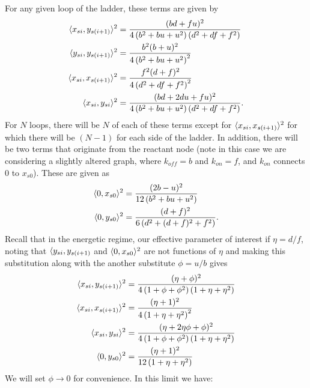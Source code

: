For any given loop of the ladder, these terms are given by
\[
\begin{aligned}
 \langle x_{si}, y_{s(i+1)} \rangle^2 &=\frac{(b d+f u)^2}{4 \left(b^2+b u+u^2\right) \left(d^2+d f+f^2\right)}\\
 \langle y_{si}, y_{s(i+1)} \rangle^2 &= \frac{b^2 (b+u)^2}{4 \left(b^2 + bu+ u^2\right)^2}\\
 \langle x_{si}, x_{s(i+1)}\rangle^2 &=\frac{f^2 (d+f)^2}{4 \left(d^2+d f+f^2\right)^2}\\
 \langle x_{si}, y_{si}\rangle^2 &=\frac{(b d+2 d u+f u)^2}{4 \left(b^2+b u+u^2\right) \left(d^2+d f+f^2\right)}.
 \end{aligned}
\]
For $N$ loops, there will be $N$ of each of these terms except for $ \langle x_{si}, x_{s(i+1)}\rangle^2$ for which there will be $(N-1)$ for each side of the ladder.  In addition, there will be two terms that originate from the reactant node (note in this case we are considering a slightly altered graph, where $k_{off}=b$ and $k_{on}=f$, and $k_{on}$ connects 0 to $x_{s0}$).   These are given as
\[
\begin{aligned}
\langle 0, x_{s0} \rangle^2 &= \frac{(2 b-u)^2}{12 \left(b^2+b u+u^2\right)} \\
\langle 0, y_{s0} \rangle^2 &= \frac{(d+f)^2}{6 \left(d^2+(d+f)^2+f^2\right)}.\\
\end{aligned}
\]
Recall that in the energetic regime, our effective parameter of interest if $\eta=d/f$, noting that  $\langle y_{si}, y_{s(i+1)}$ and $\langle 0, x_{s0} \rangle^2$ are not functions of $\eta$ and making this substitution along with the another substitute $\phi=u/b$ gives %
\[
\begin{aligned}
 \langle x_{si}, y_{s(i+1)} \rangle^2 &=\frac{(\eta+\phi)^2}{4 \left(1+ \phi+\phi^2\right) \left(1+\eta+\eta^2\right)}\\
 \langle x_{si}, x_{s(i+1)}\rangle^2 &=\frac{(\eta+1)^2}{4 \left(1+\eta+\eta^2\right)^2}\\
 \langle x_{si}, y_{si}\rangle^2 &=\frac{(\eta+2 \eta \phi+ \phi)^2}{4 \left(1+\phi+\phi^2\right) \left(1+\eta+\eta^2\right)}\\
 \langle 0, y_{s0} \rangle^2 &=\frac{(\eta+1)^2}{12 \left(1+\eta+\eta^2\right)}\\
 \end{aligned}
\]
We will set $\phi\to0$ for convenience.  In this limit we have:
